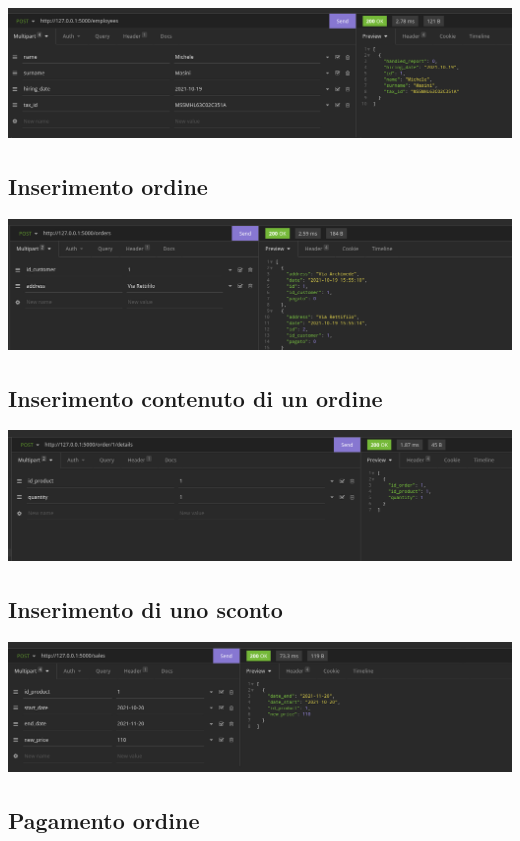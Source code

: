 \includegraphics[scale=0.33]{images/inserimento_dipendente.png}

\subsection{Inserimento ordine}
\includegraphics[scale=0.33]{images/ordine.png}

\subsection{Inserimento contenuto di un ordine}

\includegraphics[scale=0.33]{images/inserimento_contenuto.png}

\subsection{Inserimento di uno sconto}

\includegraphics[scale=0.33]{images/inserimento_sconto.png}

\subsection{Pagamento ordine}

